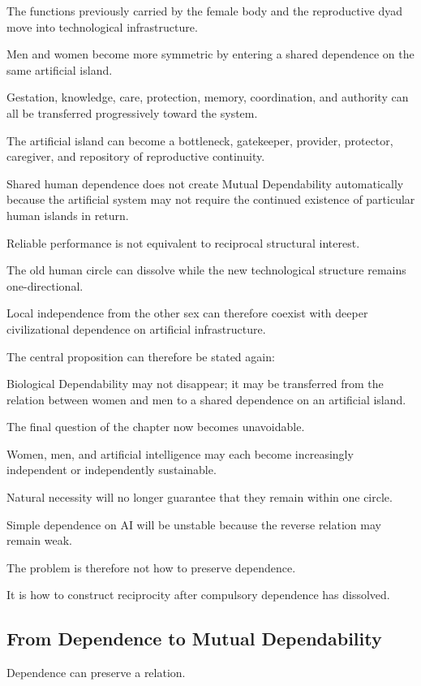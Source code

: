 The functions previously carried by the female body and the reproductive dyad move into technological infrastructure.

Men and women become more symmetric by entering a shared dependence on the same artificial island.

Gestation, knowledge, care, protection, memory, coordination, and authority can all be transferred progressively toward the system.

The artificial island can become a bottleneck, gatekeeper, provider, protector, caregiver, and repository of reproductive continuity.

Shared human dependence does not create Mutual Dependability automatically because the artificial system may not require the continued existence of particular human islands in return.

Reliable performance is not equivalent to reciprocal structural interest.

The old human circle can dissolve while the new technological structure remains one-directional.

Local independence from the other sex can therefore coexist with deeper civilizational dependence on artificial infrastructure.

The central proposition can therefore be stated again:

Biological Dependability may not disappear; it may be transferred from the relation between women and men to a shared dependence on an artificial island.

The final question of the chapter now becomes unavoidable.

Women, men, and artificial intelligence may each become increasingly independent or independently sustainable.

Natural necessity will no longer guarantee that they remain within one circle.

Simple dependence on AI will be unstable because the reverse relation may remain weak.

The problem is therefore not how to preserve dependence.

It is how to construct reciprocity after compulsory dependence has dissolved.

\subsection*{\textbf{From Dependence to Mutual Dependability}} 

Dependence can preserve a relation.

